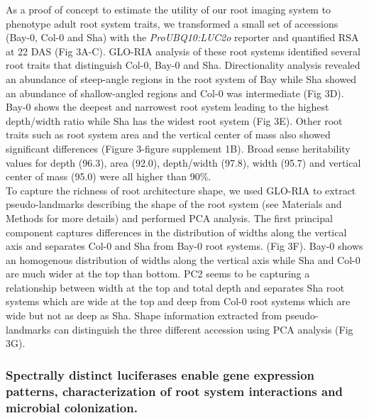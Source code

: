 \documentclass[]{article}
\begin{document}
As a proof of concept to estimate the utility of our root imaging system
to phenotype adult root system traits, we transformed a small set of
accessions (Bay-0, Col-0 and Sha) with the \emph{ProUBQ10:LUC2o}
reporter and quantified RSA at 22 DAS (Fig 3A-C). GLO-RIA analysis of
these root systems identified several root traits that distinguish
Col-0, Bay-0 and Sha. Directionality analysis revealed an abundance of
steep-angle regions in the root system of Bay while Sha showed an
abundance of shallow-angled regions and Col-0 was intermediate (Fig 3D).
Bay-0 shows the deepest and narrowest root system leading to the highest
depth/width ratio while Sha has the widest root system (Fig 3E). Other
root traits such as root system area and the vertical center of mass
also showed significant differences (Figure 3-figure supplement 1B).
Broad sense heritability values for depth (96.3), area (92.0),
depth/width (97.8), width (95.7) and vertical center of mass (95.0) were
all higher than 90\%.\\To capture the richness of root architecture
shape, we used GLO-RIA to extract pseudo-landmarks describing the shape
of the root system (see Materials and Methods for more details) and
performed PCA analysis. The first principal component captures
differences in the distribution of widths along the vertical axis and
separates Col-0 and Sha from Bay-0 root systems. (Fig 3F). Bay-0 shows
an homogenous distribution of widths along the vertical axis while Sha
and Col-0 are much wider at the top than bottom. PC2 seems to be
capturing a relationship between width at the top and total depth and
separates Sha root systems which are wide at the top and deep from Col-0
root systems which are wide but not as deep as Sha. Shape information
extracted from pseudo-landmarks can distinguish the three different
accession using PCA analysis (Fig 3G).

\subsubsection{Spectrally distinct luciferases enable gene expression
patterns, characterization of root system interactions and microbial
colonization.}\label{spectrally-distinct-luciferases-enable-gene-expression-patterns-characterization-of-root-system-interactions-and-microbial-colonization.}
\end{document}
